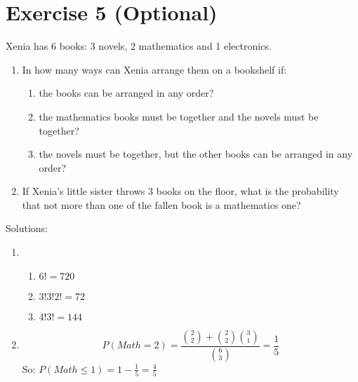 \documentclass[12pt,thmsa]{article}\usepackage[]{graphicx}\usepackage[]{color}
\begin{document}
\section*{Exercise 5 (Optional)}

Xenia has 6 books: 3 novels, 2 mathematics and 1 electronics.
\begin{enumerate}
  \item In how many ways can Xenia arrange them on a bookshelf if:
\begin{enumerate}
  \item the books can be arranged in any order?
  \item the mathematics books must be together and the novels must be together?
  \item the novels must be together, but the other books can be arranged in any order?
\end{enumerate}
  \item If Xenia's little sister throws 3 books on the floor, what is the probability that not more than one of the fallen book
  is a mathematics one?
\end{enumerate}

\noindent Solutions:

\begin{enumerate}
  \item \begin{enumerate}
          \item $6!=720$
          \item $3!3!2!=72$
          \item $4!3!=144$
        \end{enumerate}
  \item $$P(Math=2)= \frac{{2 \choose 2} +{2 \choose 2} {3 \choose 1}}{{6 \choose 3}} =\frac{1}{5}$$
  So: $P(Math \leq 1)=1-\frac{1}{5}=\frac{4}{5}$
\end{enumerate}
\end{document}
